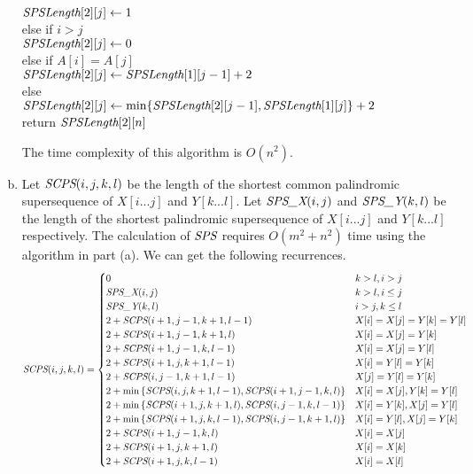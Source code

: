 \documentclass[11pt]{article}
\begin{document}
\begin{solution}
\begin{enumerate}[(a)]
\begin{algo}
\\	$\emph{SPSLength}[2][j]\gets 1$\-
\\	else if $i>j$\+
\\	$\emph{SPSLength}[2][j]\gets 0$\-
\\	else if $A[i]=A[j]$\+
\\	$\emph{SPSLength}[2][j]\gets \emph{SPSLength}[1][j-1] + 2$\-
\\	else\+
\\	$\emph{SPSLength}[2][j]\gets \text{min}\{\emph{SPSLength}[2][j-1], \emph{SPSLength}[1][j]\} + 2$\-\-\-
\\	return $\emph{SPSLength}[2][n]$\-
\end{algo}
The time complexity of this algorithm is $O(n^2)$.

\item
Let $\emph{SCPS}(i,j,k,l)$ be the length of the shortest common palindromic supersequence of $X[i...j]$ and $Y[k...l]$. Let $\emph{SPS\_X}(i,j)$ and $\emph{SPS\_Y}(k,l)$ be the length of the shortest palindromic supersequence of $X[i...j]$ and $Y[k...l]$ respectively. The calculation of $\emph{SPS}$ requires $O(m^2+n^2)$ time using the algorithm in part (a). We can get the following recurrences.
\begin{equation*}
\emph{SCPS}(i,j,k,l)=
\begin{cases}
	0&k>l, i>j\\
	\emph{SPS\_X}(i,j) &k>l,i\le j\\
	\emph{SPS\_Y}(k,l) &i>j,k\le l\\
	2+\emph{SCPS}(i+1,j-1,k+1,l-1) &X[i]=X[j]=Y[k]=Y[l]\\
	2+\emph{SCPS}(i+1,j-1,k+1,l) &X[i]=X[j]=Y[k]\\
	2+\emph{SCPS}(i+1,j-1,k,l-1) &X[i]=X[j]=Y[l]\\
	2+\emph{SCPS}(i+1,j,k+1,l-1) &X[i]=Y[l]=Y[k]\\
	2+\emph{SCPS}(i,j-1,k+1,l-1) &X[j]=Y[l]=Y[k]\\
	2+\min{\{\emph{SCPS}(i,j,k+1,l-1), \emph{SCPS}(i+1,j-1,k,l)\}} &X[i]=X[j],Y[k]=Y[l]\\
	2+\min{\{\emph{SCPS}(i+1,j,k+1,l), \emph{SCPS}(i,j-1,k,l-1)\}} &X[i]=Y[k],X[j]=Y[l]\\
	2+\min{\{\emph{SCPS}(i+1,j,k,l-1), \emph{SCPS}(i,j-1,k+1,l)\}} &X[i]=Y[l],X[j]=Y[k]\\
	2+\emph{SCPS}(i+1,j-1,k,l) &X[i]=X[j]\\
	2+\emph{SCPS}(i+1,j,k+1,l) &X[i]=X[k]\\
	2+\emph{SCPS}(i+1,j,k,l-1) &X[i]=X[l]\\

\end{cases}
\end{equation*}
\end{enumerate}
\end{solution}
\end{document}
